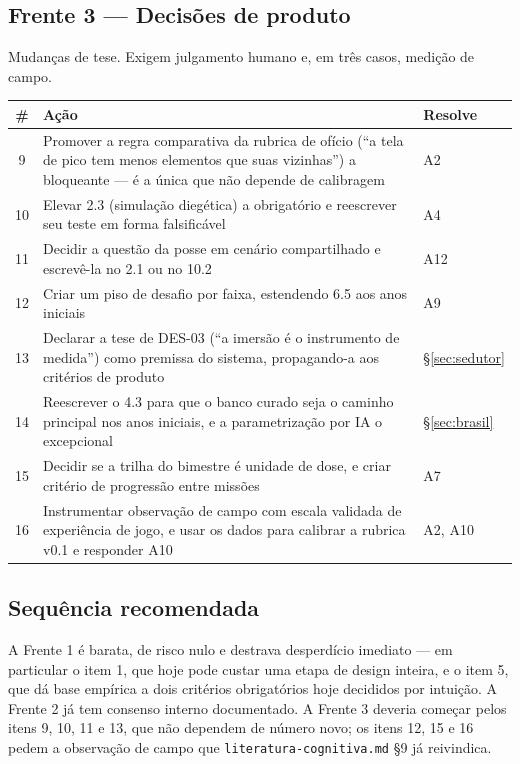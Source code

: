 \documentclass[11pt,a4paper]{article}
\begin{document}
\subsection{Frente 3 --- Decis\~oes de produto}

Mudan\c{c}as de tese. Exigem julgamento humano e, em tr\^es casos, medi\c{c}\~ao de campo.

\begin{center}
\begin{tabular}{@{}c p{9.6cm} l@{}}
\toprule
\textbf{\#} & \textbf{A\c{c}\~ao} & \textbf{Resolve} \\
\midrule
9 & Promover a regra comparativa da rubrica de of\'icio (``a tela de pico tem menos elementos que
    suas vizinhas'') a bloqueante --- \'e a \'unica que n\~ao depende de calibragem & A2 \\
10 & Elevar 2.3 (simula\c{c}\~ao diegética) a obrigat\'orio e reescrever seu teste em forma
    falsific\'avel & A4 \\
11 & Decidir a quest\~ao da posse em cen\'ario compartilhado e escrev\^e-la no 2.1 ou no 10.2 & A12 \\
12 & Criar um piso de desafio por faixa, estendendo 6.5 aos anos iniciais & A9 \\
13 & Declarar a tese de DES-03 (``a imers\~ao \'e o instrumento de medida'') como premissa do
    sistema, propagando-a aos crit\'erios de produto & \S\ref{sec:sedutor} \\
14 & Reescrever o 4.3 para que o banco curado seja o caminho principal nos anos iniciais, e a
    parametriza\c{c}\~ao por IA o excepcional & \S\ref{sec:brasil} \\
15 & Decidir se a trilha do bimestre \'e unidade de dose, e criar crit\'erio de progress\~ao entre
    miss\~oes & A7 \\
16 & Instrumentar observa\c{c}\~ao de campo com escala validada de experi\^encia de jogo, e usar os
    dados para calibrar a rubrica v0.1 e responder A10 & A2, A10 \\
\bottomrule
\end{tabular}
\end{center}

\subsection{Sequ\^encia recomendada}

A Frente 1 \'e barata, de risco nulo e destrava desperd\'icio imediato --- em particular o item 1,
que hoje pode custar uma etapa de design inteira, e o item 5, que d\'a base emp\'irica a dois
crit\'erios obrigat\'orios hoje decididos por intui\c{c}\~ao. A Frente 2 j\'a tem consenso interno
documentado. A Frente 3 deveria come\c{c}ar pelos itens 9, 10, 11 e 13, que n\~ao dependem de
n\'umero novo; os itens 12, 15 e 16 pedem a observa\c{c}\~ao de campo que
\texttt{literatura-cognitiva.md} \S9 j\'a reivindica.
\end{document}

